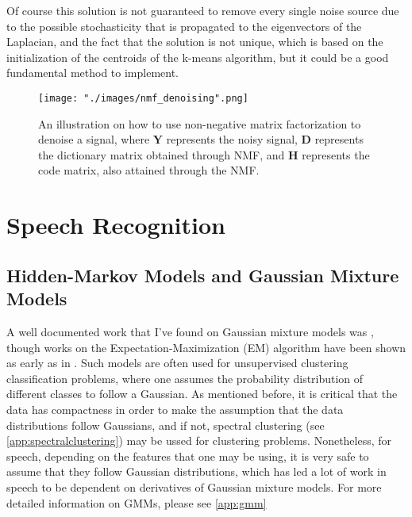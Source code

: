 Of course this solution is not guaranteed to remove every single noise source due to the possible stochasticity that is propagated to the eigenvectors of the Laplacian, and the fact that the solution is not unique, which is based on the initialization of the centroids of the k-means algorithm, but it could be a good fundamental method to implement.

\begin{figure}[ht]
\begin{center}
    \texttt{[image: "./images/nmf\_denoising".png]}
    \caption{An illustration on how to use non-negative matrix factorization to denoise a signal, where $\bm{Y}$ represents the noisy signal, $\bm{D}$ represents the dictionary matrix obtained through NMF, and $\bm{H}$ represents the code matrix, also attained through the NMF. }
    \label{fig::nmf_denoising}
\end{center}
\end{figure}

\section{Speech Recognition}
\subsection{Hidden-Markov Models and Gaussian Mixture Models} \label{sec:hmm}
A well documented work that I've found on Gaussian mixture models was \cite{GMM1}, though works on the Expectation-Maximization (EM) algorithm have been shown as early as in \cite{dudaHart1973}. Such models are often used for unsupervised clustering classification problems, where one assumes the probability distribution of different classes to follow a Gaussian. As mentioned before, it is critical that the data has compactness in order to make the assumption that the data distributions follow Gaussians, and if not, spectral clustering (see \ref{app:spectralclustering}) may be ussed for clustering problems. Nonetheless, for speech, depending on the features that one may be using, it is very safe to assume that they follow Gaussian distributions, which has led a lot of work in speech to be dependent on derivatives of Gaussian mixture models. For more detailed information on GMMs, please see \ref{app:gmm}

